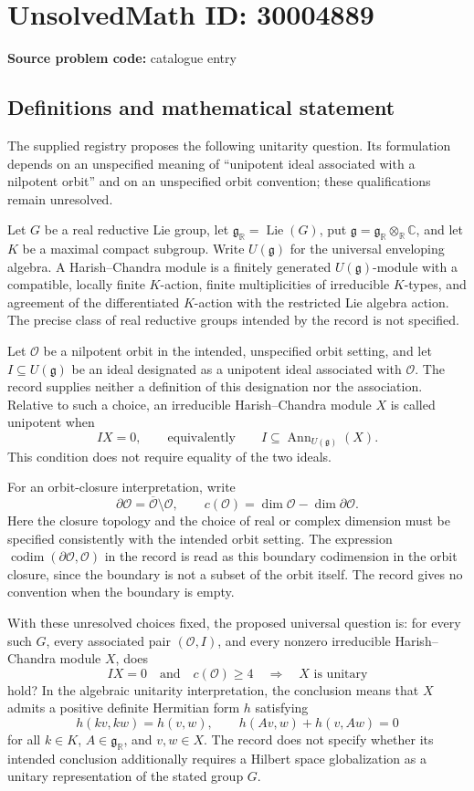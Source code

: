 \documentclass[11pt]{article}
\newcommand{\R}{\mathbb{R}}
\newcommand{\C}{\mathbb{C}}
\begin{document}
\section*{UnsolvedMath ID: 30004889}
\textbf{Source problem code:} catalogue entry
\subsection{Definitions and mathematical statement}
The supplied registry proposes the following unitarity question. Its formulation depends on an unspecified meaning of ``unipotent ideal associated with a nilpotent orbit'' and on an unspecified orbit convention; these qualifications remain unresolved.

Let \(G\) be a real reductive Lie group, let \(\mathfrak g_{\R}=\operatorname{Lie}(G)\), put \(\mathfrak g=\mathfrak g_{\R}\otimes_{\R}\C\), and let \(K\) be a maximal compact subgroup. Write \(U(\mathfrak g)\) for the universal enveloping algebra. A Harish--Chandra module is a finitely generated \(U(\mathfrak g)\)-module with a compatible, locally finite \(K\)-action, finite multiplicities of irreducible \(K\)-types, and agreement of the differentiated \(K\)-action with the restricted Lie algebra action. The precise class of real reductive groups intended by the record is not specified.

Let \(\mathcal O\) be a nilpotent orbit in the intended, unspecified orbit setting, and let \(I\subseteq U(\mathfrak g)\) be an ideal designated as a unipotent ideal associated with \(\mathcal O\). The record supplies neither a definition of this designation nor the association. Relative to such a choice, an irreducible Harish--Chandra module \(X\) is called unipotent when
\[
I X=0,
\qquad\text{equivalently}\qquad
I\subseteq\operatorname{Ann}_{U(\mathfrak g)}(X).
\]
This condition does not require equality of the two ideals.

For an orbit-closure interpretation, write
\[
\partial\mathcal O=\overline{\mathcal O}\setminus\mathcal O,
\qquad
c(\mathcal O)=\dim\mathcal O-\dim\partial\mathcal O.
\]
Here the closure topology and the choice of real or complex dimension must be specified consistently with the intended orbit setting. The expression \(\operatorname{codim}(\partial\mathcal O,\mathcal O)\) in the record is read as this boundary codimension in the orbit closure, since the boundary is not a subset of the orbit itself. The record gives no convention when the boundary is empty.

With these unresolved choices fixed, the proposed universal question is: for every such \(G\), every associated pair \((\mathcal O,I)\), and every nonzero irreducible Harish--Chandra module \(X\), does
\[
I X=0\quad\text{and}\quad c(\mathcal O)\geq 4
\quad\Longrightarrow\quad
X\text{ is unitary}
\]
hold? In the algebraic unitarity interpretation, the conclusion means that \(X\) admits a positive definite Hermitian form \(h\) satisfying
\[
h(kv,kw)=h(v,w),\qquad
h(Av,w)+h(v,Aw)=0
\]
for all \(k\in K\), \(A\in\mathfrak g_{\R}\), and \(v,w\in X\). The record does not specify whether its intended conclusion additionally requires a Hilbert space globalization as a unitary representation of the stated group \(G\).
\end{document}
